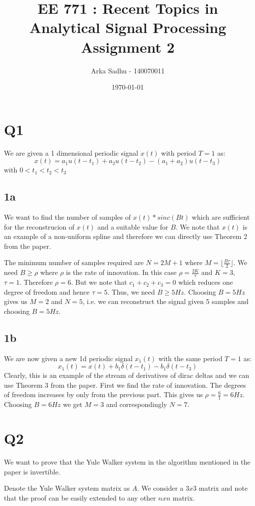 \documentclass{article}
\title{EE 771 : Recent Topics in Analytical Signal Processing Assignment 2}
\author{Arka Sadhu - 140070011}
\date{\today}
\begin{document}
\maketitle

\section*{Q1}
We are given a 1 dimensional periodic signal $x(t)$ with period $T=1$ as:
$$x(t) = a_1 u(t - t_1) + a_2 u(t - t_2) - (a_1 + a_2) u(t - t_3)$$
with $0 < t_1 < t_2 < t_3$
\subsection*{1a}
We want to find the number of samples of $x(t) * sinc(Bt)$ which are sufficient for the reconstrucion of $x(t)$ and a suitable value for $B$. We note that $x(t)$ is an example of a non-uniform spline and therefore we can directly use Theorem 2 from the paper.

The minimum number of samples required are $N = 2M + 1$ where $M = \lfloor \frac{B \tau}{2} \rfloor$. We need $B \ge \rho$ where $\rho$ is the rate of innovation. In this case $\rho = \frac{2K}{\tau}$ and $K = 3$, $\tau = 1$. Therefore $\rho = 6$. But we note that $c_1 + c_2 + c_3 = 0$ which reduces one degree of freedom and hence $\tau = 5$. Thus, we need $B \ge 5Hz$. Choosing $B = 5Hz$ gives us $M = 2$ and $N = 5$, i.e. we can reconstruct the signal given 5 samples and choosing $B = 5Hz$.

\subsection*{1b}
We are now given a new 1d periodic signal $x_1(t)$ with the same period $T=1$ as:
$$x_1(t) = x(t) + b_1 \delta (t - t_1) - b_1 \delta (t - t_3)$$
Clearly, this is an example of the stream of derivatives of dirac deltas and we can use Theorem 3 from the paper. First we find the rate of innovation. The degrees of freedom increases by only from the previous part. This gives us $\rho = \frac{6}{1} = 6Hz$. Choosing $B = 6Hz$ we get $M = 3$ and correspondingly $N=7$.

\section*{Q2}
We want to prove that the Yule Walker system in the algorithm mentioned in the paper is invertible.

Denote the Yule Walker system matrix as $A$. We consider a $3x3$ matrix and note that the proof can be easily extended to any other $nxn$ matrix.
\end{document}
